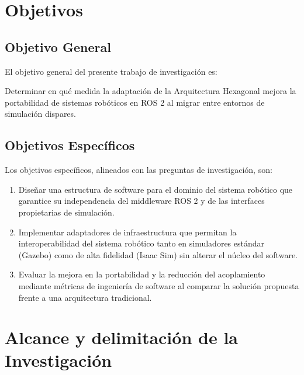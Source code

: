 \section{Objetivos}


\subsection{Objetivo General}

El objetivo general del presente trabajo de investigación es:

Determinar en qué medida la adaptación de la Arquitectura Hexagonal mejora la portabilidad de sistemas robóticos en ROS 2 al migrar entre entornos de simulación dispares.


\subsection{Objetivos Específicos}

Los objetivos específicos, alineados con las preguntas de investigación, son:

\begin{enumerate}
    \item Diseñar una estructura de software para el dominio del sistema robótico que garantice su independencia del middleware ROS 2 y de las interfaces propietarias de simulación.
    
    \item Implementar adaptadores de infraestructura que permitan la interoperabilidad del sistema robótico tanto en simuladores estándar (Gazebo) como de alta fidelidad (Isaac Sim) sin alterar el núcleo del software.
    
    \item Evaluar la mejora en la portabilidad y la reducción del acoplamiento mediante métricas de ingeniería de software al comparar la solución propuesta frente a una arquitectura tradicional.
\end{enumerate}





\section{Alcance y delimitación de la Investigación}

